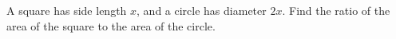 A square has side length $x$, and a circle has diameter $2x$. Find the ratio of the area of the square to the area of the circle.
